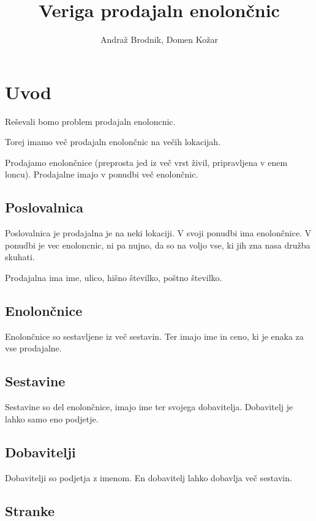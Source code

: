 \documentclass[12pt]{article}
\title{Veriga prodajaln enolončnic}
\author{Andraž Brodnik, Domen Kožar}
\let\stdsection\section
\renewcommand\section{\newpage\stdsection}
\begin{document}

\maketitle

\tableofcontents


\section{Uvod}


Reševali bomo problem prodajaln enoloncnic. 

Torej imamo več prodajaln enolončnic na večih lokacijah.

Prodajamo enolončnice (preprosta jed iz več vrst živil, pripravljena v enem loncu). Prodajalne imajo v ponudbi več enolončnic.

\subsection{Poslovalnica}

Poslovalnica je prodajalna je na neki lokaciji. V svoji ponudbi ima enolončnice. V ponudbi je vec enoloncnic, ni pa nujno, da so na voljo vse, ki jih zna nasa družba skuhati.

Prodajalna ima ime, ulico, hišno številko, poštno številko.

\subsection{Enolončnice}

Enolončnice so sestavljene iz več sestavin. Ter imajo ime in ceno, ki je enaka za vse prodajalne.


\subsection{Sestavine}

Sestavine so del enolončnice, imajo ime ter svojega dobavitelja. Dobavitelj je lahko samo eno podjetje.

\subsection{Dobavitelji}

Dobavitelji so podjetja z imenom. En dobavitelj lahko dobavlja več sestavin.

\subsection{Stranke}
\end{document}
